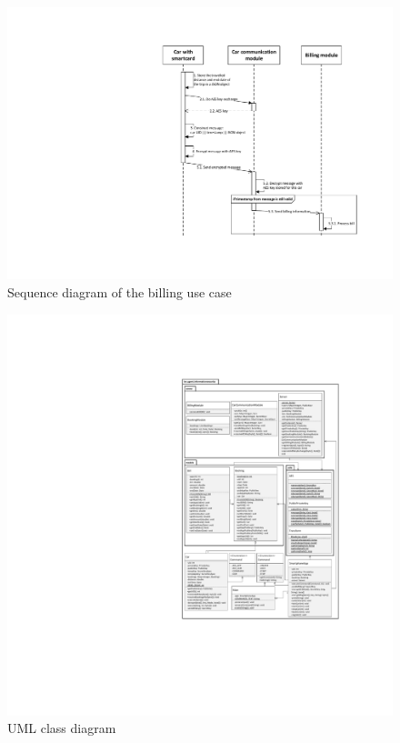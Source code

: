 \documentclass[12pt,a4paper, oneside]{article}
\begin{document}
\begin{figure}[H]
\centering
\includegraphics[width=.9\textwidth]{assets/sequencediagram-billing}
\caption{Sequence diagram of the billing use case}
\label{fig:sequencediagram-billing}
\end{figure}

\begin{figure}[p]
  \centering
  \includegraphics[width=\textwidth, height=.95\textheight, keepaspectratio, origin=c]{assets/architecture-uml}
  \caption{UML class diagram}
  \label{fig:uml-class-diagram}
\end{figure}




\pagebreak
 

\end{document}
